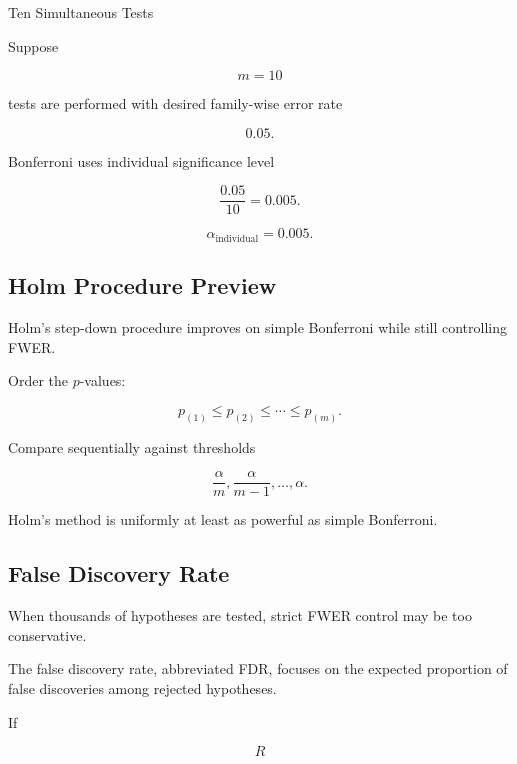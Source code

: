 \begin{workedexamplebox}{Ten Simultaneous Tests}

Suppose

\[
m=10
\]

tests are performed with desired family-wise error rate

\[
0.05.
\]

Bonferroni uses individual significance level

\[
\frac{0.05}{10}
=
0.005.
\]

\begin{answerbox}
\[
\boxed{
\alpha_{\text{individual}}
=
0.005.
}
\]
\end{answerbox}

\end{workedexamplebox}

\subsection{Holm Procedure Preview}
\label{subsec:holm-procedure-preview}

Holm's step-down procedure improves on simple Bonferroni while still
controlling FWER.

Order the \(p\)-values:

\[
p_{(1)}
\leq
p_{(2)}
\leq
\cdots
\leq
p_{(m)}.
\]

Compare sequentially against thresholds

\[
\boxed{
\frac{\alpha}{m},
\frac{\alpha}{m-1},
\ldots,
\alpha.
}
\]

Holm's method is uniformly at least as powerful as simple Bonferroni.

\subsection{False Discovery Rate}
\label{subsec:false-discovery-rate}

When thousands of hypotheses are tested, strict FWER control may be too
conservative.

The false discovery rate, abbreviated FDR, focuses on the expected
proportion of false discoveries among rejected hypotheses.

If

\[
R
\]

